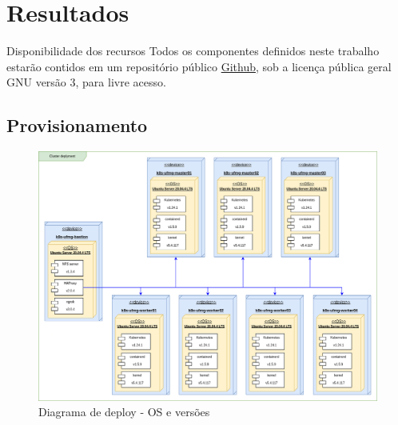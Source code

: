 \documentclass[10pt,brazil]{beamer}
\theoremstyle{definition}
\begin{document}


\section{Resultados}

\begin{frame}{Disponibilidade dos recursos}
  Todos os componentes definidos neste trabalho estarão contidos em um repositório público \href{https://github.com/felipefrocha/esufmg-tcc}{Github}, sob a licença pública geral GNU versão 3, para livre acesso.
\end{frame}

\subsection{Provisionamento}

\begin{frame}
  \hspace*{-15mm}
  \begin{figure}
      \centering
      \includegraphics[width=.9\textwidth]{TCC - Kubenertes-Cluster Deplyment.drawio.png}
      \caption{Diagrama de deploy - OS e versões}
      \label{fig:k8s-arch-deploy}
  \end{figure}
  \end{frame}
\end{document}
